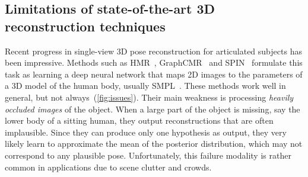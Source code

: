 \begin{figure}
  \setlength{\fboxsep}{0pt}%
  \setlength{\fboxrule}{0pt}%
  \vspace{-0.2cm}
  \end{figure}

\subsection{Limitations of state-of-the-art 3D reconstruction techniques}

Recent progress in single-view 3D pose reconstruction for articulated subjects has been impressive.
Methods such as HMR~\citep{kanazawa18end-to-end}, GraphCMR~\citep{kolotouros19convolutional} and SPIN~\citep{kolotouros19learning} formulate this task as learning a deep neural network that maps 2D images to the parameters of a 3D model of the human body, usually SMPL~\cite{loper15smpl}.
These methods work well in general, but not always~(\cref{fig:issues}).
Their main weakness is processing \emph{heavily occluded images} of the object.
When a large part of the object is missing, say the lower body of a sitting human, they output reconstructions that are often implausible.
Since they can produce only one hypothesis as output, they very likely learn to approximate the mean of the posterior distribution, which may not correspond to any plausible pose.
Unfortunately, this failure modality is rather common in applications due to scene clutter and crowds.


